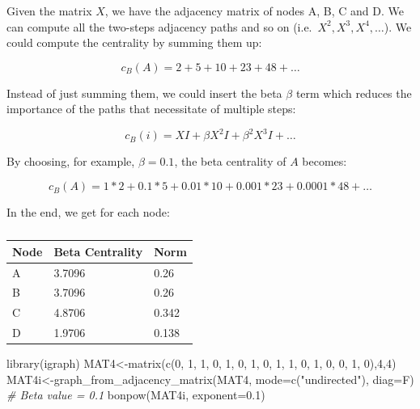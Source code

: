 \documentclass[
  notitlepage,
  onecolumn,
  openany]{book}
\newenvironment{Shaded}{\begin{snugshade}}{\end{snugshade}}
\newcommand{\AttributeTok}[1]{\textcolor[rgb]{0.77,0.63,0.00}{#1}}
\newcommand{\CommentTok}[1]{\textcolor[rgb]{0.56,0.35,0.01}{\textit{#1}}}
\newcommand{\DecValTok}[1]{\textcolor[rgb]{0.00,0.00,0.81}{#1}}
\newcommand{\FloatTok}[1]{\textcolor[rgb]{0.00,0.00,0.81}{#1}}
\newcommand{\FunctionTok}[1]{\textcolor[rgb]{0.00,0.00,0.00}{#1}}
\newcommand{\NormalTok}[1]{#1}
\newcommand{\OtherTok}[1]{\textcolor[rgb]{0.56,0.35,0.01}{#1}}
\newcommand{\StringTok}[1]{\textcolor[rgb]{0.31,0.60,0.02}{#1}}
\begin{document}
Given the matrix \(X\), we have the adjacency matrix of nodes A, B, C and D. We can compute all the two-steps adjacency paths and so on (i.e.~\(X^2, X^3, X^4,\dots\)). We could compute the centrality by summing them up:

\[
c_B(A) = 2+5+10+23+48+\dots
\]

Instead of just summing them, we could insert the beta \(\beta\) term which reduces the importance of the paths that necessitate of multiple steps:

\[
c_B(i) = XI+\beta X^2I+\beta^2X^3I+\dots
\]

By choosing, for example, \(\beta = 0.1\), the beta centrality of \(A\) becomes:

\[
c_B(A) = 1*2+0.1*5+0.01*10+0.001*23+0.0001*48+\dots
\]

In the end, we get for each node:

\begin{table}[h]
\centering
\begin{tabular}{@{}lll@{}}
\toprule
\textbf{Node} & \textbf{Beta Centrality} & \textbf{Norm} \\ \midrule
A             & 3.7096                   & 0.26          \\
B             & 3.7096                   & 0.26          \\
C             & 4.8706                   & 0.342         \\
D             & 1.9706                   & 0.138         \\ \bottomrule
\end{tabular}
\caption{}
\label{tab:my-table}
\end{table}

\begin{Shaded}
\begin{Highlighting}[]
\FunctionTok{library}\NormalTok{(igraph)}
\NormalTok{MAT4}\OtherTok{\textless{}{-}}\FunctionTok{matrix}\NormalTok{(}\FunctionTok{c}\NormalTok{(}\DecValTok{0}\NormalTok{, }\DecValTok{1}\NormalTok{, }\DecValTok{1}\NormalTok{, }\DecValTok{0}\NormalTok{,}
               \DecValTok{1}\NormalTok{, }\DecValTok{0}\NormalTok{, }\DecValTok{1}\NormalTok{, }\DecValTok{0}\NormalTok{,}
               \DecValTok{1}\NormalTok{, }\DecValTok{1}\NormalTok{, }\DecValTok{0}\NormalTok{, }\DecValTok{1}\NormalTok{,}
               \DecValTok{0}\NormalTok{, }\DecValTok{0}\NormalTok{, }\DecValTok{1}\NormalTok{, }\DecValTok{0}\NormalTok{),}\DecValTok{4}\NormalTok{,}\DecValTok{4}\NormalTok{)}
\NormalTok{MAT4i}\OtherTok{\textless{}{-}}\FunctionTok{graph\_from\_adjacency\_matrix}\NormalTok{(MAT4,}
                                   \AttributeTok{mode=}\FunctionTok{c}\NormalTok{(}\StringTok{"undirected"}\NormalTok{),}
                                   \AttributeTok{diag=}\NormalTok{F)}
\CommentTok{\# Beta value = 0.1}
\FunctionTok{bonpow}\NormalTok{(MAT4i, }\AttributeTok{exponent=}\FloatTok{0.1}\NormalTok{)}
\end{Highlighting}
\end{Shaded}
\end{document}
